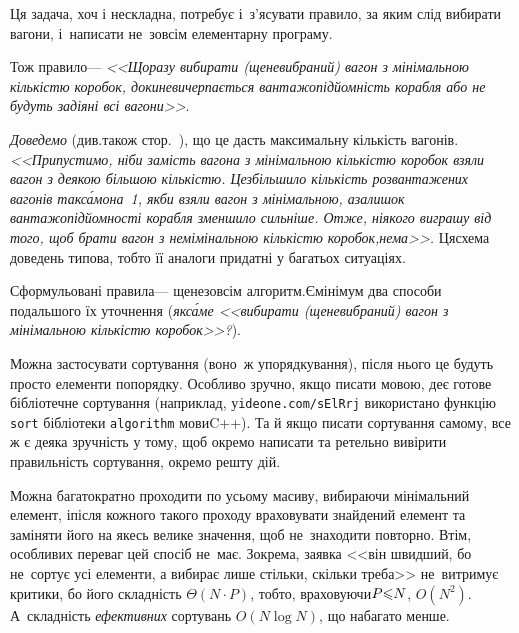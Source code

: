 \Tutorial	Ця задача, хоч і нескладна, потребує і~з'ясувати правило, за яким слід вибирати вагони, і~написати не~зовсім елементарну програму. 

Тож правило\nolinebreak[3] --- \textsl{<<Щоразу вибирати (ще\nolinebreak[3] не\nolinebreak[3] вибраний) вагон з мінімальною кількістю коробок, доки\nolinebreak[3] не\nolinebreak[3] вичерпається вантажопідйомність корабля або не будуть задіяні всі вагони>>}.

\label{text:proof-example-train-to-ship} %
\emph{Доведемо} (див.\nolinebreak[2] також стор.~\pageref{text:need-or-no-need-to-prove}), що це дасть максимальну кількість вагонів.
\textsl{<<Припустимо, ніби замість вагона з мінімальною кількістю коробок взяли вагон з деякою більшою кількістю. Це\nolinebreak[3] збільшило кількість розвантажених вагонів так\nolinebreak[3] с\'{а}мо\nolinebreak[1] на~1, якби взяли вагон з мінімальною, а\nolinebreak[3] залишок вантажо\-підйом\-ності корабля зменшило сильніше. Отже, ніякого виграшу від того, щоб брати вагон з немімінальною кількістю коробок,\nolinebreak[1] \mbox{нема}>>.} 
Ця\nolinebreak[2] схема доведень типова, тобто її аналоги придатні у багатьох ситуаціях.


Сформульовані правила\nolinebreak[3] --- ще\nolinebreak[2] не\nolinebreak[3] зовсім алгоритм.\linebreak[1] Є\nolinebreak[3] мінімум два способи подальшого їх уточнення (\emph{як\nolinebreak[3] с\'{а}ме \textsl{<<вибирати (ще\nolinebreak[3] не\nolinebreak[3] вибраний) вагон з мінімальною кількістю коробок>>}?}).

Можна застосувати сортування (воно~ж упорядкування), після нього це будуть просто елементи  по\nolinebreak[3] порядку. Особливо зручно, якщо писати мовою, де\nolinebreak[2] є готове бібліотечне сортування (наприклад, у\nolinebreak[2] \verb"ideone.com/sElRrj" використано функцію \verb"sort" бібліотеки \verb"algorithm" мови\nolinebreak[3] C++). Та й якщо писати сортування самому, все ж є деяка зручність у тому, щоб окремо написати та ретельно вивірити правильність сортування, окремо решту дій.

Можна багатократно проходити по усьому масиву, вибираючи мінімальний елемент, і\nolinebreak[3] після кожного такого проходу враховувати знайдений елемент та заміняти його на якесь велике значення, щоб не~знаходити повторно. Втім, особливих переваг цей спосіб не~має. Зокрема, заявка <<він швидший, бо не~сортує усі елементи, а вибирає лише стільки, скільки треба>> не~витримує критики, бо його складність ${\Theta(N\cdot{}P)}$, тобто, враховуючи\nolinebreak[3] $P{\leqslant}N$, $O(N^2)$. А~складність \emph{ефективних} сортувань $O(N\log{}N)$, що набагато менше.